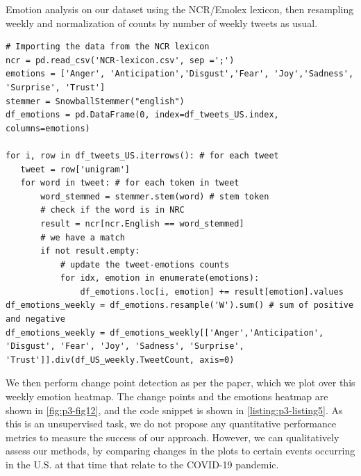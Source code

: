 \begin{listing*}
\caption{Emotion analysis on our dataset using the NCR/Emolex lexicon, then resampling weekly and normalization of counts by number of weekly tweets as usual.}
\begin{verbatim}
# Importing the data from the NCR lexicon
ncr = pd.read_csv('NCR-lexicon.csv', sep =';')
emotions = ['Anger', 'Anticipation','Disgust','Fear', 'Joy','Sadness', 'Surprise', 'Trust']
stemmer = SnowballStemmer("english")
df_emotions = pd.DataFrame(0, index=df_tweets_US.index, columns=emotions)

for i, row in df_tweets_US.iterrows(): # for each tweet
   tweet = row['unigram']
   for word in tweet: # for each token in tweet
       word_stemmed = stemmer.stem(word) # stem token
       # check if the word is in NRC
       result = ncr[ncr.English == word_stemmed]
       # we have a match
       if not result.empty:
           # update the tweet-emotions counts
           for idx, emotion in enumerate(emotions):
               df_emotions.loc[i, emotion] += result[emotion].values
df_emotions_weekly = df_emotions.resample('W').sum() # sum of positive and negative
df_emotions_weekly = df_emotions_weekly[['Anger','Anticipation', 'Disgust', 'Fear', 'Joy', 'Sadness', 'Surprise', 'Trust']].div(df_US_weekly.TweetCount, axis=0)
\end{verbatim}
\label{listing:p3-listing4}
\end{listing*}

We then perform change point detection as per the paper, which we plot over this weekly emotion heatmap. The change points and the emotions heatmap are shown in \cref{fig:p3-fig12}, and the code snippet is shown in \cref{listing:p3-listing5}.
As this is an unsupervised task, we do not propose any quantitative performance metrics to measure the success of our approach. However, we can qualitatively assess our methods, by comparing changes in the plots to certain events occurring in the U.S. at that time that relate to the COVID-19 pandemic.

